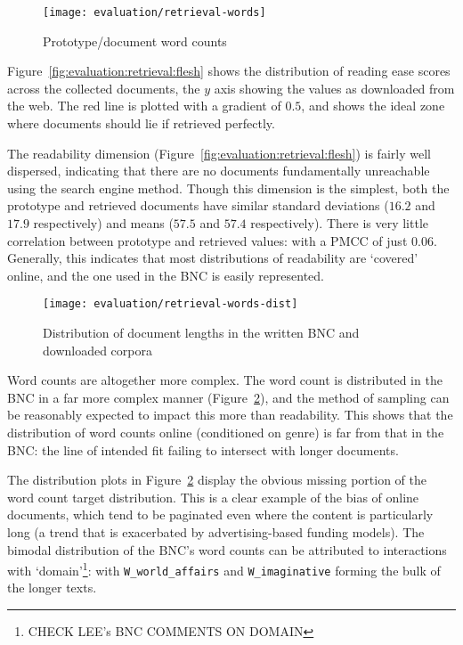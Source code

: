 \begin{figure}[Ht]
    \centering
    \texttt{[image: evaluation/retrieval-words]}
    \caption{Prototype/document word counts}
    \label{fig:evaluation:retrieval:words}
\end{figure}

Figure~\ref{fig:evaluation:retrieval:flesh} shows the distribution of reading ease scores across the collected documents, the $y$ axis showing the values as downloaded from the web.  The red line is plotted with a gradient of $0.5$, and shows the ideal zone where documents should lie if retrieved perfectly.


The readability dimension (Figure~\ref{fig:evaluation:retrieval:flesh}) is fairly well dispersed, indicating that there are no documents fundamentally unreachable using the search engine method.  Though this dimension is the simplest, both the prototype and retrieved documents have similar standard deviations ($16.2$ and $17.9$ respectively) and means ($57.5$ and $57.4$ respectively).  There is very little correlation between prototype and retrieved values: with a PMCC of just $0.06$.  Generally, this indicates that most distributions of readability are `covered' online, and the one used in the BNC is easily represented.

\begin{figure}[Ht]
    \centering
    \texttt{[image: evaluation/retrieval-words-dist]}
    \caption{Distribution of document lengths in the written BNC and downloaded corpora}
    \label{fig:evaluation:retrieval:words-dist}
\end{figure}

Word counts are altogether more complex.  The word count is distributed in the BNC in a far more complex manner (Figure~\ref{fig:evaluation:retrieval:words-dist}), and the method of sampling can be reasonably expected to impact this more than readability.  This shows that the distribution of word counts online (conditioned on genre) is far from that in the BNC: the line of intended fit failing to intersect with longer documents.

The distribution plots in Figure~\ref{fig:evaluation:retrieval:words-dist} display the obvious missing portion of the word count target distribution.  This is a clear example of the bias of online documents, which tend to be paginated even where the content is particularly long (a trend that is exacerbated by advertising-based funding models).  The bimodal distribution of the BNC's word counts can be attributed to interactions with `domain'\footnote{CHECK LEE's BNC COMMENTS ON DOMAIN}: with \texttt{W\_world\_affairs} and \texttt{W\_imaginative} forming the bulk of the longer texts.

